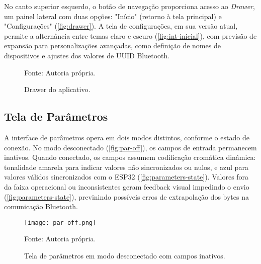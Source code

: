 No canto superior esquerdo, o botão de navegação proporciona acesso ao \textit{Drawer}, um painel lateral com duas opções: "Início" (retorno à tela principal) e "Configurações" (\autoref{fig:drawer}). A tela de configurações, em sua versão atual, permite a alternância entre temas claro e escuro (\autoref{fig:int-inicial}), com previsão de expansão para personalizações avançadas, como definição de nomes de dispositivos e ajustes dos valores de UUID Bluetooth.

\begin{figure}[ht]
    \caption{Drawer do aplicativo.}
    \label{fig:drawer}
    \centering
    \hfill
    \hfill

    {\centering\footnotesize Fonte: Autoria própria.\par}

  \end{figure}

\subsection{Tela de Parâmetros}\label{subsec:parametros}
A interface de parâmetros opera em dois modos distintos, conforme o estado de conexão. No modo desconectado (\autoref{fig:par-off}), os campos de entrada permanecem inativos. Quando conectado, os campos assumem codificação cromática dinâmica: tonalidade amarela para indicar valores não sincronizados ou nulos, e azul para valores válidos sincronizados com o ESP32 (\autoref{fig:parameters-state}). Valores fora da faixa operacional ou inconsistentes geram feedback visual impedindo o envio (\autoref{fig:parameters-state}), previnindo possíveis erros de extrapolação dos bytes na comunicação Bluetooth.

\begin{figure}[ht]
    \centering
    \caption{Tela de parâmetros em modo desconectado com campos inativos.}
    \label{fig:par-off}
    \texttt{[image: par-off.png]}

    {\centering\footnotesize Fonte: Autoria própria.\par}
\end{figure}

